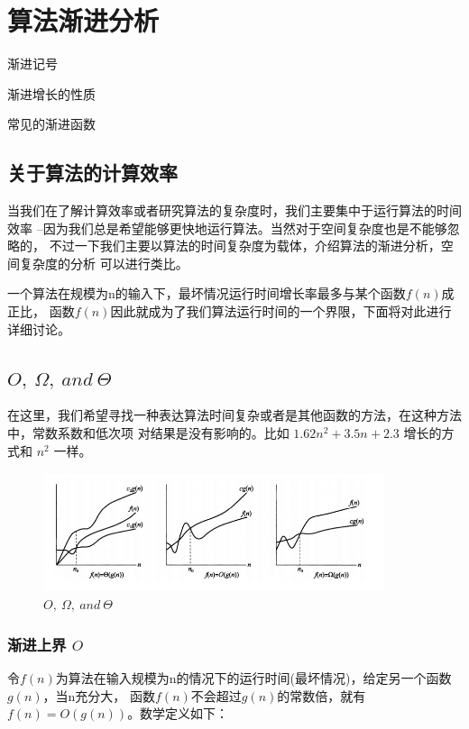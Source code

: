 \chapter{算法渐进分析}

\begin{introduction}
   \item 渐进记号
   \item 渐进增长的性质
   \item 常见的渐进函数
\end{introduction}

\section{关于算法的计算效率}
当我们在了解计算效率或者研究算法的复杂度时，我们主要集中于运行算法的时间效率
--因为我们总是希望能够更快地运行算法。当然对于空间复杂度也是不能够忽略的，
不过一下我们主要以算法的时间复杂度为载体，介绍算法的渐进分析，空间复杂度的分析
可以进行类比。
 
一个算法在规模为n的输入下，最坏情况运行时间增长率最多与某个函数$f(n)$成正比，
函数$f(n)$因此就成为了我们算法运行时间的一个界限，下面将对此进行详细讨论。
 
\section{\texorpdfstring{$O,\ \Omega,\ and\ \Theta $}{O, Ω, and θ}}
在这里，我们希望寻找一种表达算法时间复杂或者是其他函数的方法，在这种方法中，常数系数和低次项
对结果是没有影响的。比如 $1.62n^2+3.5n+2.3$ 增长的方式和 $n^2$ 一样。

\begin{figure}[h]
   \begin{minipage}[t]{1\linewidth}
      \centering
      \includegraphics[width=10cm,height=3.5cm]{image/asymptotic_analysis_1.png}
      \caption{$O,\ \Omega,\ and\ \Theta $}
   \end{minipage}
\end{figure}
 
\subsection{渐进上界 $O$}
令$f(n)$为算法在输入规模为n的情况下的运行时间(最坏情况)，给定另一个函数$g(n)$，当n充分大，
函数$f(n)$不会超过$g(n)$的常数倍，就有$f(n)=O(g(n))$。数学定义如下：

